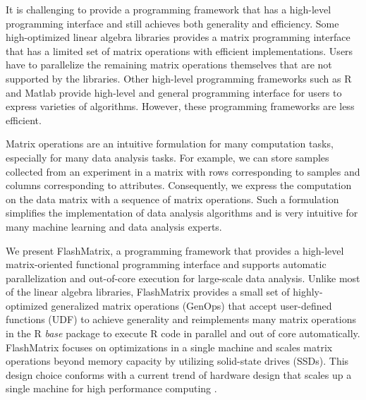 
It is challenging to provide a programming framework that has a high-level
programming interface and still achieves both generality and efficiency.
Some high-optimized linear algebra libraries \cite{mkl, openblas, elemental,
trilinos, petsc} provides a matrix programming interface that has a limited
set of matrix operations with efficient implementations. Users have to
parallelize the remaining matrix
operations themselves that are not supported by the libraries. Other
high-level programming frameworks such as R and Matlab provide high-level and
general programming interface for users to express varieties of algorithms.
However, these programming frameworks are less efficient.


Matrix operations are an intuitive formulation for many computation tasks,
especially for many data analysis tasks. For example, we can store samples
collected from an experiment in a matrix with rows corresponding to samples
and columns corresponding to attributes.
Consequently, we express the computation on the data matrix with a sequence
of matrix operations. Such a formulation simplifies the implementation of
data analysis algorithms and is very intuitive for many machine learning
and data analysis experts.

We present FlashMatrix, a programming framework that provides a high-level
matrix-oriented functional programming interface and supports automatic
parallelization and out-of-core execution for large-scale data analysis.
Unlike most of the linear algebra libraries, FlashMatrix provides a small
set of highly-optimized generalized matrix operations (GenOps) that accept
user-defined functions (UDF) to achieve generality and reimplements many matrix
operations in the R \textit{base} package to execute R code in parallel and
out of core automatically. FlashMatrix focuses on optimizations in
a single machine and scales matrix operations beyond memory capacity by utilizing
solid-state drives (SSDs). This design choice conforms with a current trend of
hardware design that scales up a single machine for high performance computing
\cite{Ang14}.


